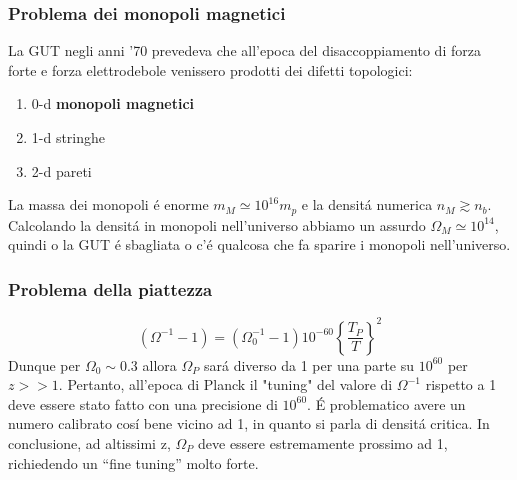 \documentclass[12pt, a4paper]{article}
\begin{document}
\subsubsection{Problema dei monopoli magnetici}
La GUT negli anni '70 prevedeva che all'epoca del disaccoppiamento di forza forte e forza elettrodebole venissero prodotti dei difetti topologici:
\begin{enumerate}
\item 0-d \textbf{monopoli magnetici}
\item 1-d stringhe
\item 2-d pareti
\end{enumerate}
La massa dei monopoli \'{e} enorme $m_M \simeq 10^{16} m_p$  e la densit\'{a} numerica $n_M \gtrsim n_b $. Calcolando la densit\'{a} in monopoli nell'universo abbiamo un assurdo $\Omega_M\simeq10^{14}$, quindi o la GUT \'{e} sbagliata o c'\'{e} qualcosa che fa sparire i monopoli nell'universo.
\subsubsection{Problema della piattezza}
\begin{equation}
(\Omega^{-1}-1)=(\Omega_0^{-1}-1)10^{-60}\left\{\frac{T_P}{T}\right\}^2
\end{equation}
Dunque per $\Omega_0 \sim 0.3 $ allora $\Omega_P$ sar\'{a} diverso da 1 per una parte su $10^{60}$ per $z>>1$. Pertanto, all'epoca di Planck il "tuning" del valore di $\Omega^{-1}$ rispetto a 1 deve essere stato fatto con una precisione di $10^{60}$. \'{E} problematico avere un numero calibrato cos\'{i} bene vicino ad 1, in quanto si parla di densit\'{a} critica. In conclusione, ad altissimi z, $\Omega_P $ deve essere estremamente prossimo ad 1, richiedendo un “fine tuning” molto forte.
\end{document}
